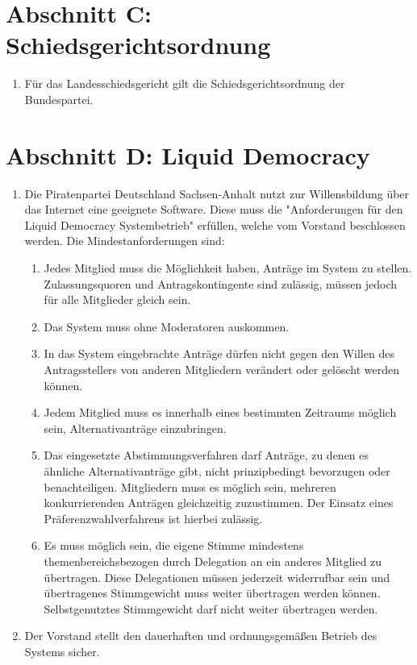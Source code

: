 \section{Abschnitt C: Schiedsgerichtsordnung}
\begin{enumerate}
\item Für das Landesschiedsgericht gilt die Schiedsgerichtsordnung der
Bundespartei.
\end{enumerate}


\section{Abschnitt D: Liquid Democracy}
\begin{enumerate}
\item Die Piratenpartei Deutschland Sachsen-Anhalt nutzt zur Willensbildung über
das Internet eine geeignete Software. Diese muss die "Anforderungen für den
Liquid Democracy Systembetrieb" erfüllen, welche vom Vorstand beschlossen
werden.
Die Mindestanforderungen sind:
\begin{enumerate}
\item Jedes Mitglied muss die Möglichkeit haben, Anträge im System zu stellen.
Zulassungsquoren und Antragskontingente sind zulässig, müssen jedoch für alle
Mitglieder gleich sein.
\item Das System muss ohne Moderatoren auskommen.
\item In das System eingebrachte Anträge dürfen nicht gegen den Willen des
Antragsstellers von anderen Mitgliedern verändert oder gelöscht werden können.
\item Jedem Mitglied muss es innerhalb eines bestimmten Zeitraums möglich sein,
Alternativanträge einzubringen.
\item Das eingesetzte Abstimmungsverfahren darf Anträge, zu denen es ähnliche
Alternativanträge gibt, nicht prinzipbedingt bevorzugen oder benachteiligen.
Mitgliedern muss es möglich sein, mehreren konkurrierenden Anträgen gleichzeitig
zuzustimmen. Der Einsatz eines Präferenzwahlverfahrens ist hierbei zulässig.
\item Es muss möglich sein, die eigene Stimme mindestens themenbereichsbezogen
durch Delegation an ein anderes Mitglied zu übertragen. Diese Delegationen
müssen jederzeit widerrufbar sein und übertragenes Stimmgewicht muss weiter
übertragen werden können. Selbstgenutztes Stimmgewicht darf nicht weiter
übertragen werden.
\end{enumerate}

\item Der Vorstand stellt den dauerhaften und ordnungsgemäßen Betrieb des
Systems sicher.


\end{enumerate}
